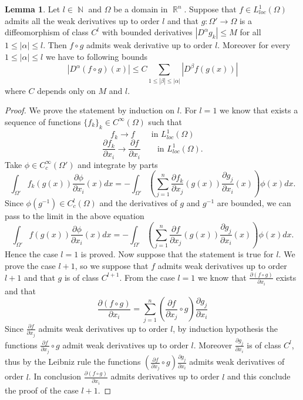 \documentclass[12pt]{article}
\theoremstyle{definition}
\newtheorem{lemma}{Lemma}
\DeclareMathOperator\rr{\mathbb{R}}
\DeclareMathOperator\nn{\mathbb{N}}
\begin{document}
\begin{lemma}\label{composition}
Let $l \in \nn$ and $\Omega$ be a domain in $\rr^n$. Suppose that $f \in L^1_{loc}(\Omega)$ admits all the weak derivatives up to order $l$ and that $g:\Omega'\rightarrow \Omega$ is a diffeomorphism of class $C^l$ with bounded derivatives $|D^\alpha g_k|\le M$ for all $1 \le |\alpha| \le l$. Then $f\circ g$ admits weak derivative up to order $l$. Moreover for every $1\le |\alpha|\le l$ we have to following bounds
\[ |D^\alpha (f\circ g)(x)|\le C \sum_{1\le|\beta|\le |\alpha|} |D^\beta f(g(x))|\]
where $C$ depends only on $M$ and $l$.
\end{lemma}
\begin{proof}
We prove the statement by induction on $l$. For $l=1$ we know that exists a sequence of functions $\{f_k\}_k  \in C^\infty(\Omega)$ such that
\[ f_k \rightarrow f \qquad \text{in } L^1_{loc}(\Omega) \]
\[ \frac{\partial f_k }{\partial x_i}\rightarrow \frac{\partial f }{\partial x_i} \qquad \text{in } L^1_{loc}(\Omega).\]
Take $\phi \in C^\infty_c(\Omega')$ and integrate by parts
\[\int_{\Omega'} f_k(g(x))\frac{\partial \phi }{\partial x_i}(x)dx = - \int_{\Omega'} \left(\sum_{j=1}^n \frac{\partial f_k }{\partial x_j}(g(x))\frac{\partial g_j }{\partial x_i}(x)\right)\phi(x)dx.\]
Since $\phi(g^{-1}) \in C^l_c(\Omega)$ and the derivatives of $g$ and $g^{-1}$ are bounded, we can pass to the limit in the above equation
\[\int_{\Omega'} f(g(x))\frac{\partial \phi }{\partial x_i}(x)dx = - \int_{\Omega'} \left(\sum_{j=1}^n \frac{\partial f }{\partial x_j}(g(x))\frac{\partial g_j }{\partial x_i}(x)\right)\phi(x)dx.\]
Hence the case $l=1$ is proved. Now suppose that the statement is true for $l$. We prove the case $l+1$, so we suppose that $f$ admits weak derivatives up to order $l+1$ and that $g$ is of class $C^{l+1}$. From the case $l=1$ we know that $\frac{\partial (f \circ g) }{\partial x_i}$ exists and that
\[ \frac{\partial (f \circ g) }{\partial x_i}= \sum_{j=1}^n (\frac{\partial f }{\partial x_j} \circ g)\frac{\partial g_j }{\partial x_i}\] 
Since $\frac{\partial f }{\partial x_j}$ admits weak derivatives up to order $l$, by induction hypothesis the functions $\frac{\partial f }{\partial x_j} \circ g$ admit weak derivatives up to order $l$. Moreover $\frac{\partial g_j }{\partial x_i}$ is of class $C^l$, thus by the Leibniz rule the functions $(\frac{\partial f }{\partial x_j} \circ g)\frac{\partial g_j }{\partial x_i}$ admits weak derivatives of order $l$. In conclusion $\frac{\partial (f \circ g) }{\partial x_i}$ admits derivatives up to order $l$ and this conclude the proof of the case $l+1$. 


\end{proof}
\end{document}
